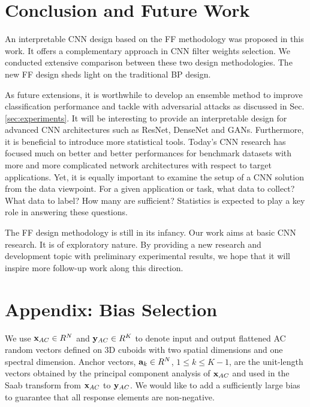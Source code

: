 \documentclass[preprint,12pt]{elsarticle}
\begin{document}
\section{Conclusion and Future Work}\label{sec:conclusion}

An interpretable CNN design based on the FF methodology was proposed in
this work. It offers a complementary approach in CNN filter weights
selection. We conducted extensive comparison between these two design
methodologies. The new FF design sheds light on the traditional BP
design. 

As future extensions, it is worthwhile to develop an ensemble method to
improve classification performance and tackle with adversarial attacks
as discussed in Sec. \ref{sec:experiments}.  It will be interesting to
provide an interpretable design for advanced CNN architectures such as
ResNet, DenseNet and GANs.  Furthermore, it is beneficial to introduce
more statistical tools.  Today's CNN research has focused much on better
and better performances for benchmark datasets with more and more
complicated network architectures with respect to target applications.
Yet, it is equally important to examine the setup of a CNN solution from
the data viewpoint. For a given application or task, what data to
collect?  What data to label?  How many are sufficient?  Statistics is
expected to play a key role in answering these questions. 

The FF design methodology is still in its infancy.  Our work aims at
basic CNN research. It is of exploratory nature.  By providing a new
research and development topic with preliminary experimental results, we
hope that it will inspire more follow-up work along this direction. 

\section*{Appendix: Bias Selection}\label{subsec:saab}

We use ${\bf x}_{AC} \in R^N$ and ${\bf y}_{AC} \in R^K$ to denote input
and output flattened AC random vectors defined on 3D cuboids with two
spatial dimensions and one spectral dimension.  Anchor vectors, ${\bf
a}_k \in R^N$, $1 \le k \le K-1$, are the unit-length vectors obtained
by the principal component analysis of ${\bf x}_{AC}$ and used in the
Saab transform from ${\bf x}_{AC}$ to ${\bf y}_{AC}$.  We would like to
add a sufficiently large bias to guarantee that all response elements
are non-negative. 
\end{document}
